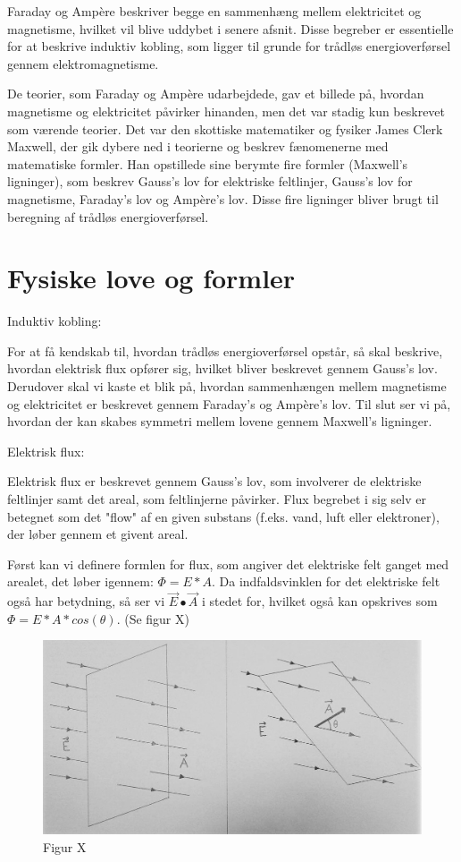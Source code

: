 Faraday og Ampère beskriver begge en sammenhæng mellem elektricitet og magnetisme, hvilket vil blive uddybet i senere afsnit. Disse begreber er essentielle for at beskrive induktiv kobling, som ligger til grunde for trådløs energioverførsel gennem elektromagnetisme.

De teorier, som Faraday og Ampère udarbejdede, gav et billede på, hvordan magnetisme og elektricitet påvirker hinanden, men det var stadig kun beskrevet som værende teorier. Det var den skottiske matematiker og fysiker James Clerk Maxwell, der gik dybere ned i teorierne og beskrev fænomenerne med matematiske formler. Han opstillede sine berymte fire formler (Maxwell's ligninger), som beskrev Gauss's lov for elektriske feltlinjer, Gauss's lov for magnetisme, Faraday's lov og Ampère's lov. Disse fire ligninger bliver brugt til beregning af trådløs energioverførsel.

\chapter{Fysiske love og formler}

Induktiv kobling:

For at få kendskab til, hvordan trådløs energioverførsel opstår, så skal beskrive, hvordan elektrisk flux opfører sig, hvilket bliver beskrevet gennem Gauss's lov. Derudover skal vi kaste et blik på, hvordan sammenhængen mellem magnetisme og elektricitet er beskrevet gennem Faraday's og Ampère's lov. Til slut ser vi på, hvordan der kan skabes symmetri mellem lovene gennem Maxwell's ligninger.

Elektrisk flux:

Elektrisk flux er beskrevet gennem Gauss's lov, som involverer de elektriske feltlinjer samt det areal, som feltlinjerne påvirker. Flux begrebet i sig selv er betegnet som det "flow" af en given substans (f.eks. vand, luft eller elektroner), der løber gennem et givent areal.

Først kan vi definere formlen for flux, som angiver det elektriske felt ganget med arealet, det løber igennem: $\Phi = E * A$. Da indfaldsvinklen for det elektriske felt også har betydning, så ser vi $\vec{E} \bullet \vec{A}$ i stedet for, hvilket også kan opskrives som $\Phi = E * A * cos(\theta)$. (Se figur X)

\begin{figure}[H]
\centering
\includegraphics[scale=0.5]{Vildledning/Schematics/Vinkelflux}
\caption{Figur X}
\end{figure}

